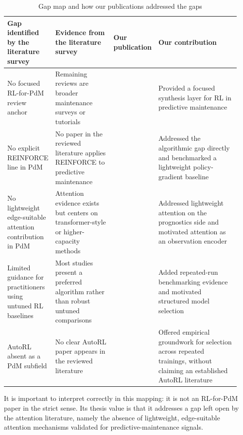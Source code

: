 \documentclass[12pt,oneside]{book}
\renewcommand{\arraystretch}{1.5}
\begin{document}
\begin{table}[htbp]
	\renewcommand{\arraystretch}{1.3}
	\centering
	\begin{minipage}{\textwidth}
		\caption{Gap map and how our publications addressed the gaps}\label{tbl:slr-gap-map-contrib}
		\begin{tabular}{@{}L{0.20\linewidth}L{0.25\linewidth}L{0.15\linewidth}L{0.35\linewidth}@{}}
			\toprule
			\textbf{Gap identified by the literature survey} & \textbf{Evidence from the literature survey} & \textbf{Our publication} & \textbf{Our contribution}\\
			\midrule
			No focused RL-for-PdM review anchor & Remaining reviews are broader maintenance surveys or tutorials \citep{Mar23,Net26,Zha24d} & \cite{Siraskar2023SLR} & Provided a focused synthesis layer for RL in predictive maintenance\\
			No explicit REINFORCE line in PdM & No paper in the reviewed literature applies REINFORCE to predictive maintenance & \cite{Siraskar2025} & Addressed the algorithmic gap directly and benchmarked a lightweight policy-gradient baseline\\
			No lightweight edge-suitable attention contribution in PdM & Attention evidence exists but centers on transformer-style or higher-capacity methods \citep{Zha23,Guo26,Li25} & \cite{Siraskar2024NW} & Addressed lightweight attention on the prognostics side and motivated attention as an observation encoder\\
			Limited guidance for practitioners using untuned RL baselines & Most studies present a preferred algorithm rather than robust untuned comparisons & \cite{Siraskar2025} & Added repeated-run benchmarking evidence and motivated structured model selection\\
			AutoRL absent as a PdM subfield & No clear AutoRL paper appears in the reviewed literature & \cite{Siraskar2025} & Offered empirical groundwork for selection across repeated trainings, without claiming an established AutoRL literature\\
			\bottomrule
		\end{tabular}
	\end{minipage}
\end{table}

It is important to interpret \citep{Siraskar2024NW} correctly in this mapping: it is not an RL-for-PdM paper in the strict sense. Its thesis value is that it addresses a gap left open by the attention literature, namely the absence of lightweight, edge-suitable attention mechanisms validated for predictive-maintenance signals.
\end{document}
